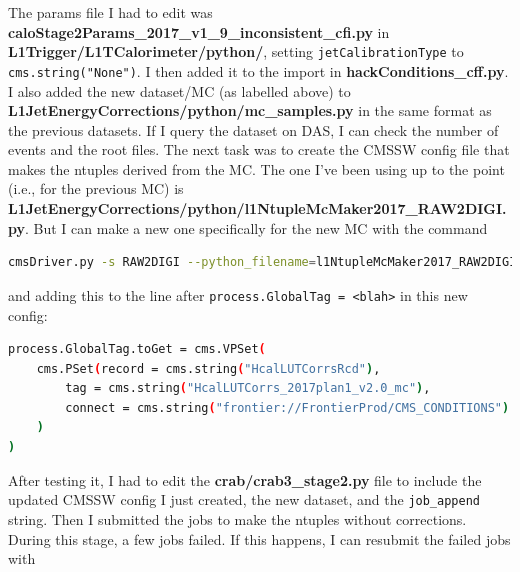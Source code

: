 The params file I had to edit was \textbf{caloStage2Params\_2017\_v1\_9\_inconsistent\_cfi.py} in \textbf{L1Trigger/L1TCalorimeter/python/}, setting \texttt{jetCalibrationType} to \texttt{cms.string("None")}. I then added it to the import in \textbf{hackConditions\_cff.py}. I also added the new dataset/MC (as labelled above) to \textbf{L1JetEnergyCorrections/python/mc\_samples.py} in the same format as the previous datasets. If I query the dataset on DAS, I can check the number of events and the root files. The next task was to create the CMSSW config file that makes the ntuples derived from the MC. The one I've been using up to the point (i.e., for the previous MC) is \textbf{L1JetEnergyCorrections/python/l1NtupleMcMaker2017\_RAW2DIGI.py}. But I can make a new one specifically for the new MC with the command

\begin{lstlisting}[belowskip=-0.7cm, language=sh, numbers=none]
cmsDriver.py -s RAW2DIGI --python_filename=l1NtupleMcMaker2017_RAW2DIGI_reEmu_HCAL_TPs.py -n 100 --no_output --no_exec --era=Run2_2017 --mc --conditions=92X_upgrade2017_TSG_For90XSamples_V1 --customise=L1Trigger/Configuration/customiseReEmul.L1TReEmulMCFrom90xRAWSimHcalTP --customise=L1Trigger/L1TNtuples/customiseL1Ntuple.L1NtupleRAWEMUGEN_MC --customise=L1Trigger/Configuration/customiseSettings.L1TSettingsToCaloStage2Params_2017_v1_9_inconsistent --filein=/store/mc/PhaseISpring17DR/QCD_Pt-15to3000_TuneCUETP8M1_Flat_13TeV_pythia8/GEN-SIM-RAW/FlatPU0to70NZS_90X_upgrade2017_realistic_v20-v1/120000/003FF53C-8232-E711-9340-7CD30ACE160C.root
\end{lstlisting}

and adding this to the line after \texttt{process.GlobalTag = <blah>} in this new config:

\begin{lstlisting}[belowskip=-0.7cm, language=sh, numbers=none]
process.GlobalTag.toGet = cms.VPSet(
    cms.PSet(record = cms.string("HcalLUTCorrsRcd"),
        tag = cms.string("HcalLUTCorrs_2017plan1_v2.0_mc"),
        connect = cms.string("frontier://FrontierProd/CMS_CONDITIONS")
    )
)
\end{lstlisting}

After testing it, I had to edit the \textbf{crab/crab3\_stage2.py} file to include the updated CMSSW config I just created, the new dataset, and the \texttt{job\_append} string. Then I submitted the jobs to make the ntuples without corrections. During this stage, a few jobs failed. If this happens, I can resubmit the failed jobs with

